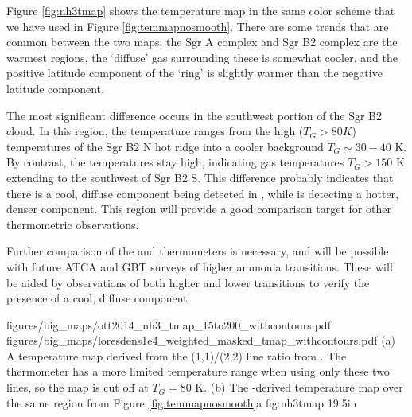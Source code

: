 Figure \ref{fig:nh3tmap} shows the \citet{Ott2014a} temperature map in the same
color scheme that we have used in Figure \ref{fig:temmapnosmooth}.  There are some
trends that are common between the two maps: the Sgr A complex and Sgr B2
complex are the warmest regions, the `diffuse' gas surrounding these is
somewhat cooler, and the positive latitude component of the
\citet{Molinari2011a} `ring' is slightly warmer than the negative latitude
component.

The most significant difference occurs in the southwest portion of the Sgr B2
cloud.  In this region, the \ammonia temperature ranges from the high ($T_G>80K$)
temperatures of the Sgr B2 N hot ridge into a cooler background $T_G\sim30-40$ K.
By contrast, the \formaldehyde temperatures stay high, indicating gas
temperatures $T_G>150$ K extending to the southwest of Sgr B2 S.  This difference
probably indicates that there is a cool, diffuse component being detected in
\ammonia, while \formaldehyde is detecting a hotter, denser component.  This
region will provide a good comparison target for other thermometric
observations.  

Further comparison of the \ammonia and \formaldehyde thermometers is necessary,
and will be possible with future ATCA and GBT surveys of higher ammonia
transitions.  These will be aided by observations of both higher and lower
\formaldehyde transitions \citep{Mangum1993a} to verify the presence of a cool,
diffuse component.



\RotFigureTwoAA
{figures/big_maps/ott2014_nh3_tmap_15to200_withcontours.pdf}
{figures/big_maps/loresdens1e4_weighted_masked_tmap_withcontours.pdf}
{(a) A temperature map derived from the \ammonia (1,1)/(2,2) line ratio from
\citet{Ott2014a}.  The \ammonia thermometer has a more limited temperature
range when using only these two lines, so the map is cut off at $T_G=80$ K.
(b) The \para-derived temperature map over the same region from Figure
\ref{fig:temmapnosmooth}a
}
{fig:nh3tmap}
{1}{9.5in}

